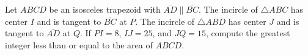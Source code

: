 Let $ABCD$ be an isosceles trapezoid with $\overline{AD} \parallel \overline{BC}$. The incircle of $\triangle ABC$ has center $I$ and is tangent to $\overline{BC}$ at $P$. The incircle of $\triangle ABD$ has center $J$ and is tangent to $\overline{AD}$ at $Q$. If $PI = 8$, $IJ = 25$, and $JQ = 15$, compute the greatest integer less than or equal to the area of $ABCD$.
